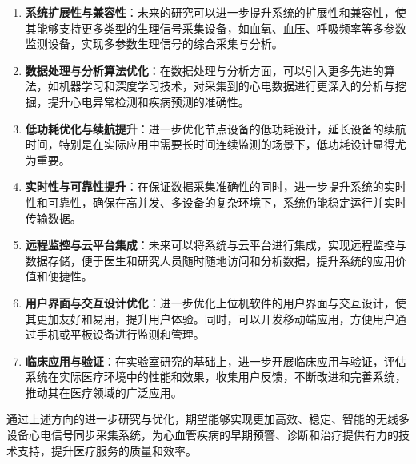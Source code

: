 \begin{enumerate}
    \item \textbf{系统扩展性与兼容性}：未来的研究可以进一步提升系统的扩展性和兼容性，使其能够支持更多类型的生理信号采集设备，如血氧、血压、呼吸频率等多参数监测设备，实现多参数生理信号的综合采集与分析。

    \item \textbf{数据处理与分析算法优化}：在数据处理与分析方面，可以引入更多先进的算法，如机器学习和深度学习技术，对采集到的心电数据进行更深入的分析与挖掘，提升心电异常检测和疾病预测的准确性。

    \item \textbf{低功耗优化与续航提升}：进一步优化节点设备的低功耗设计，延长设备的续航时间，特别是在实际应用中需要长时间连续监测的场景下，低功耗设计显得尤为重要。

    \item \textbf{实时性与可靠性提升}：在保证数据采集准确性的同时，进一步提升系统的实时性和可靠性，确保在高并发、多设备的复杂环境下，系统仍能稳定运行并实时传输数据。

    \item \textbf{远程监控与云平台集成}：未来可以将系统与云平台进行集成，实现远程监控与数据存储，便于医生和研究人员随时随地访问和分析数据，提升系统的应用价值和便捷性。

    \item \textbf{用户界面与交互设计优化}：进一步优化上位机软件的用户界面与交互设计，使其更加友好和易用，提升用户体验。同时，可以开发移动端应用，方便用户通过手机或平板设备进行监测和管理。

    \item \textbf{临床应用与验证}：在实验室研究的基础上，进一步开展临床应用与验证，评估系统在实际医疗环境中的性能和效果，收集用户反馈，不断改进和完善系统，推动其在医疗领域的广泛应用。
\end{enumerate}

通过上述方向的进一步研究与优化，期望能够实现更加高效、稳定、智能的无线多设备心电信号同步采集系统，为心血管疾病的早期预警、诊断和治疗提供有力的技术支持，提升医疗服务的质量和效率。

\newpage

